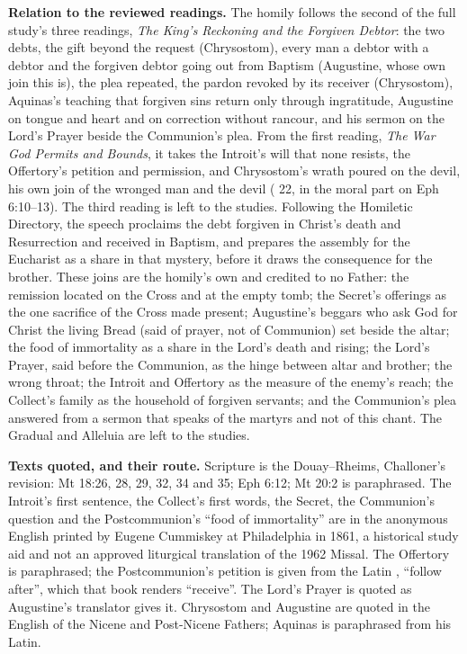{\textbf{Relation to the reviewed readings.} The homily follows the second of
the full study's three readings, \textit{The King's Reckoning and the Forgiven
Debtor}: the two debts, the gift beyond the request (Chrysostom), every man a
debtor with a debtor and the forgiven debtor going out from Baptism
(Augustine, whose own join this is), the plea repeated, the pardon revoked by
its receiver (Chrysostom), Aquinas's teaching that forgiven sins return only
through ingratitude, Augustine on tongue and heart and on correction without
rancour, and his sermon on the Lord's Prayer beside the Communion's plea. From
the first reading, \textit{The War God Permits and Bounds}, it takes the
Introit's will that none resists, the Offertory's petition and permission, and
Chrysostom's wrath poured on the devil, his own join of the wronged man and the
devil ( 22, in the moral part on Eph 6:10--13). The
third reading is left to the studies. Following the Homiletic Directory, the
speech proclaims the debt forgiven in Christ's death and Resurrection and
received in Baptism, and prepares the assembly for the Eucharist as a share in
that mystery, before it draws the consequence for the brother. These joins are
the homily's own and credited to no Father: the remission located on the Cross
and at the empty tomb; the Secret's offerings as the one sacrifice of the Cross
made present; Augustine's beggars who ask God for Christ the living Bread (said
of prayer, not of Communion) set beside the altar; the food of immortality as a
share in the Lord's death and rising; the Lord's Prayer, said before the
Communion, as the hinge between altar and brother; the wrong throat; the
Introit and Offertory as the measure of the enemy's reach; the Collect's family
as the household of forgiven servants; and the Communion's plea answered from a
sermon that speaks of the martyrs and not of this chant. The Gradual and
Alleluia are left to the studies.

\textbf{Texts quoted, and their route.} Scripture is the Douay--Rheims,
Challoner's revision: Mt 18:26, 28, 29, 32, 34 and 35; Eph 6:12; Mt 20:2 is
paraphrased. The Introit's first sentence, the Collect's first words, the
Secret, the Communion's question and the Postcommunion's ``food of
immortality'' are in the anonymous English printed by Eugene Cummiskey at
Philadelphia in 1861, a historical study aid and not an approved liturgical
translation of the 1962 Missal. The Offertory is paraphrased; the
Postcommunion's petition is given from the Latin , ``follow
after'', which that book renders ``receive''. The Lord's Prayer is quoted as
Augustine's translator gives it. Chrysostom and Augustine are quoted in the
English of the Nicene and Post-Nicene Fathers; Aquinas is paraphrased from his
Latin.

}
